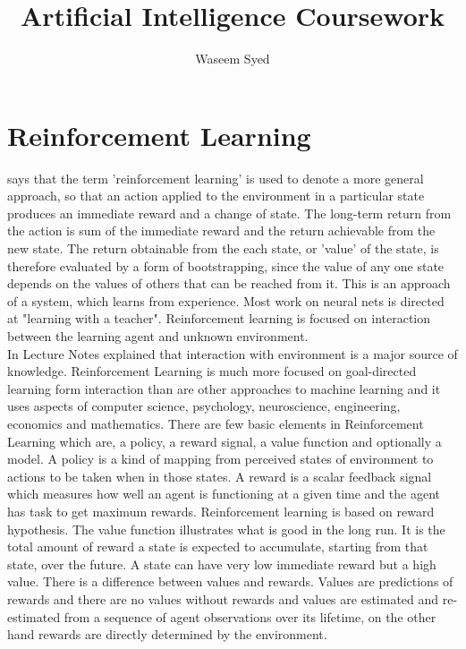\documentclass[12pt,a4paper]{article}
\author{Waseem Syed}
\title{Artificial Intelligence Coursework}
\date{}
\begin{document}
	\maketitle
	
	
	\section{Reinforcement Learning}
	
	{

\cite{sutton2011reinforcement} says that the term 'reinforcement learning' is used to denote a more general approach, so that an action applied to the environment in a particular state produces an immediate reward and a change of state. The long-term return from the action is sum of the immediate reward and the return achievable from the new state. The return obtainable from the each state, or 'value' of the state, is therefore evaluated by a form of bootstrapping, since the value of any one state depends on the values of others that can be reached from it. This is an approach of a system, which learns from experience. Most work on neural nets is directed at "learning with a teacher". Reinforcement learning is focused on interaction between the learning agent and unknown environment.\\
In Lecture Notes \cite{alrifae2019lecturennotes} explained that interaction with environment is a major source of knowledge. Reinforcement Learning is much more focused on goal-directed learning form interaction than are other approaches to machine learning and it uses aspects of computer science, psychology, neuroscience, engineering, economics and mathematics. There are few basic elements in Reinforcement Learning which are, a policy, a reward signal, a value function and optionally a model. A policy is a kind of mapping from perceived states of environment to actions to be taken when in those states. A reward is a scalar feedback signal which measures how well an agent is functioning at a given time and the agent has task to get maximum rewards. Reinforcement learning is based on reward hypothesis. The value function illustrates what is good in the long run. It is the total amount of reward a state is expected to accumulate, starting from that state, over the future. A state can have very low immediate reward but a high value. There is a difference between values and rewards. Values are predictions of rewards and there are no values without rewards and values are estimated and re-estimated from a sequence of agent observations over its lifetime, on the other hand rewards are directly determined by the environment.\\
}
\end{document}
